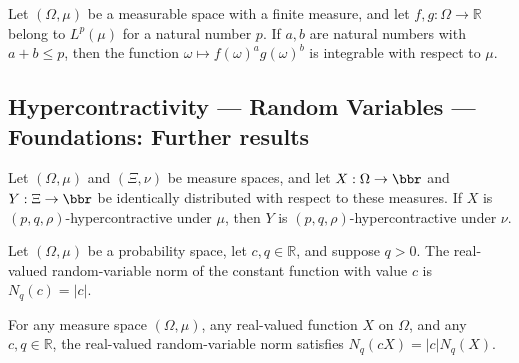 \begin{theorem}
\leanok
{}
Let $(\Omega,\mu)$ be a measurable space with a finite measure, and let
$f,g:\Omega\to\mathbb R$ belong to $L^p(\mu)$ for a natural number $p$. If $a,b$ are
natural numbers with $a+b\le p$, then the function $\omega\mapsto f(\omega)^a
g(\omega)^b$ is integrable with respect to $\mu$.
\end{theorem}

\subsection*{Hypercontractivity --- Random Variables --- Foundations: Further results}

\begin{theorem}
\label{BooleanAnalysis.Hypercontractivity.IsHypercontractive.identDistrib}
\leanok
{}
Let $(\Omega,\mu)$ and $(\Xi,\nu)$ be measure spaces, and let $X:\Omega\to\bbr$ and
$Y:\Xi\to\bbr$ be identically distributed with respect to these measures. If $X$ is
$(p,q,\rho)$-hypercontractive under $\mu$, then $Y$ is $(p,q,\rho)$-hypercontractive
under $\nu$.
\end{theorem}

\begin{theorem}
\label{BooleanAnalysis.Hypercontractivity.rvLpNorm_const}
\leanok
{}
Let $(\Omega,\mu)$ be a probability space, let $c,q\in\mathbb R$, and suppose $q>0$. The
real-valued random-variable norm of the constant function with value $c$ is
$N_q(c)=|c|$.
\end{theorem}

\begin{theorem}
\label{BooleanAnalysis.Hypercontractivity.rvLpNorm_const_mul}
\leanok
{}
For any measure space $(\Omega,\mu)$, any real-valued function $X$ on $\Omega$, and any
$c,q\in\mathbb R$, the real-valued random-variable norm satisfies $N_q(cX)=|c|N_q(X)$.
\end{theorem}

